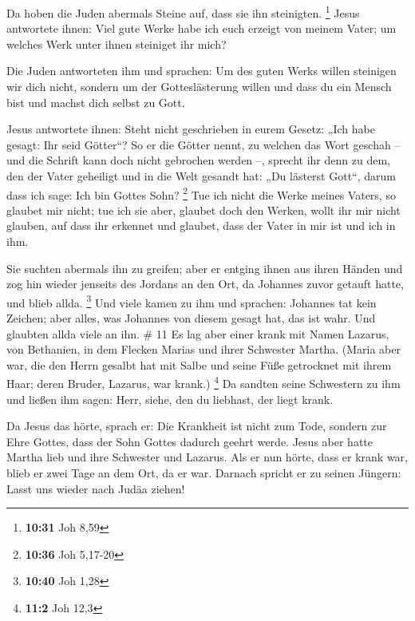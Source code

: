  Da hoben die Juden abermals Steine auf, dass sie ihn
steinigten. \footnote{\textbf{10:31} Joh 8,59}  Jesus
antwortete ihnen: Viel gute Werke habe ich euch erzeigt von meinem
Vater; um welches Werk unter ihnen steiniget ihr mich?

 Die Juden antworteten ihm und sprachen: Um des guten
Werks willen steinigen wir dich nicht, sondern um der Gotteslästerung
willen und dass du ein Mensch bist und machst dich selbst zu Gott.

 Jesus antwortete ihnen: Steht nicht geschrieben in eurem
Gesetz: „Ich habe gesagt: Ihr seid Götter``?  So er die
Götter nennt, zu welchen das Wort geschah -- und die Schrift kann doch
nicht gebrochen werden --,  sprecht ihr denn zu dem, den
der Vater geheiligt und in die Welt gesandt hat: „Du lästerst Gott``,
darum dass ich sage: Ich bin Gottes Sohn? \footnote{\textbf{10:36} Joh
  5,17-20}  Tue ich nicht die Werke meines Vaters, so
glaubet mir nicht;  tue ich sie aber, glaubet doch den
Werken, wollt ihr mir nicht glauben, auf dass ihr erkennet und glaubet,
dass der Vater in mir ist und ich in ihm.

 Sie suchten abermals ihn zu greifen; aber er entging
ihnen aus ihren Händen  und zog hin wieder jenseits des
Jordans an den Ort, da Johannes zuvor getauft hatte, und blieb allda.
\footnote{\textbf{10:40} Joh 1,28}  Und viele kamen zu
ihm und sprachen: Johannes tat kein Zeichen; aber alles, was Johannes
von diesem gesagt hat, das ist wahr.  Und glaubten allda
viele an ihn. \# 11  Es lag aber einer krank mit Namen
Lazarus, von Bethanien, in dem Flecken Marias und ihrer Schwester
Martha.  (Maria aber war, die den Herrn gesalbt hat mit
Salbe und seine Füße getrocknet mit ihrem Haar; deren Bruder, Lazarus,
war krank.) \footnote{\textbf{11:2} Joh 12,3}  Da sandten
seine Schwestern zu ihm und ließen ihm sagen: Herr, siehe, den du
liebhast, der liegt krank.

 Da Jesus das hörte, sprach er: Die Krankheit ist nicht
zum Tode, sondern zur Ehre Gottes, dass der Sohn Gottes dadurch geehrt
werde.  Jesus aber hatte Martha lieb und ihre Schwester
und Lazarus.  Als er nun hörte, dass er krank war, blieb
er zwei Tage an dem Ort, da er war.  Darnach spricht er zu
seinen Jüngern: Lasst uns wieder nach Judäa ziehen!

